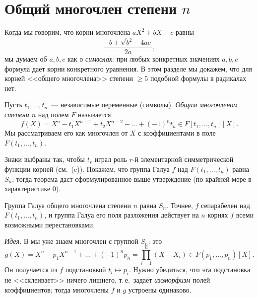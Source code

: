 \makeatletter
{}
\makeatother
\section{Общий многочлен степени $n$}

Когда мы говорим, что корни многочлена $aX^2+bX+c$ равны
\[
\frac{-b\pm\sqrt{b^2-4ac}}{2a},
\]
мы думаем об $a,b,c$ как о \emph{символах}: при любых конкретных значениях $a,b,c$ формула даёт корни конкретного
уравнения. В этом разделе мы докажем, что для корней <<общего многочлена>> степени $\ge5$ подобной формулы в радикалах нет.

\begin{definition}[5.39b]
Пусть $t_1,\dots,t_n$~--- независимые переменные (символы). \emph{Общим многочленом степени $n$} над полем $F$
называется
\[
f(X)=X^n-t_1X^{n-1}+t_2X^{n-2}-\dots+(-1)^nt_n\in F[t_1,\dots,t_n][X].
\]
Мы рассматриваем его как многочлен от $X$ с коэффициентами в поле $F(t_1,\dots,t_n)$.
\end{definition}

Знаки выбраны так, чтобы $t_r$ играл роль $r$-й элементарной симметрической функции корней (см.\ (c)). Покажем,
что группа Галуа $f$ над $F(t_1,\dots,t_n)$ равна $S_n$; тогда теорема  даст сформулированное выше утверждение (по
крайней мере в характеристике $0$).

\begin{theorem}[5.40]
Группа Галуа общего многочлена степени $n$ равна $S_n$. Точнее, $f$ сепарабелен над $F(t_1,\dots,t_n)$, и группа Галуа
его поля разложения действует на $n$ корнях $f$ всеми возможными перестановками.
\end{theorem}

\emph{Идея.} В  мы уже знаем многочлен с группой $S_n$: это
\[
g(X)=X^n-p_1X^{n-1}+\dots+(-1)^np_n=\prod_{i=1}^n(X-X_i)\in F(p_1,\dots,p_n)[X].
\]
Он получается из $f$ подстановкой $t_i\mapsto p_i$. Нужно убедиться, что эта подстановка не <<склеивает>> ничего лишнего,
т.\,е.\ задаёт \emph{изоморфизм} полей коэффициентов; тогда многочлены $f$ и $g$ устроены одинаково.

